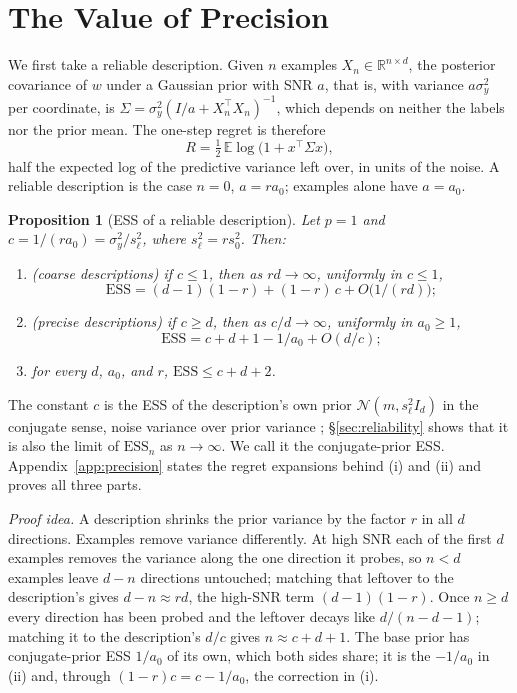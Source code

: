 \documentclass[10pt]{article}
\newtheorem{proposition}{Proposition}
\newcommand{\ess}{\mathrm{ESS}}
\newcommand{\E}{\mathbb{E}}
\newcommand{\R}{\mathbb{R}}
\begin{document}
\section{The Value of Precision}\label{sec:precision}

We first take a reliable description. Given $n$ examples $X_n \in \R^{n \times d}$, the posterior covariance of $w$ under a Gaussian prior with SNR $a$, that is, with variance $a\sigma_y^2$ per coordinate, is $\Sigma = \sigma_y^2 (I/a + X_n^\top X_n)^{-1}$, which depends on neither the labels nor the prior mean. The one-step regret is therefore
\begin{equation}\label{eq:gaussian-regret}
R = \tfrac12\, \E \log\big(1 + x^\top \Sigma x\big),
\end{equation}
half the expected log of the predictive variance left over, in units of the noise. A reliable description is the case $n = 0$, $a = r a_0$; examples alone have $a = a_0$.

\begin{proposition}[ESS of a reliable description]\label{prop:precision}
Let $p = 1$ and $c = 1/(r a_0) = \sigma_y^2/s_\ell^2$, where $s_\ell^2 = r s_0^2$. Then:
\begin{enumerate}
\item[(i)] \emph{(coarse descriptions)} if $c \le 1$, then as $rd \to \infty$, uniformly in $c \le 1$,
\[
\ess = (d-1)(1-r) + (1-r)\,c + O\big(1/(rd)\big);
\]
\item[(ii)] \emph{(precise descriptions)} if $c \ge d$, then as $c/d \to \infty$, uniformly in $a_0 \ge 1$,
\[
\ess = c + d + 1 - 1/a_0 + O(d/c);
\]
\item[(iii)] for every $d$, $a_0$, and $r$, $\ess \le c + d + 2$.
\end{enumerate}
\end{proposition}

The constant $c$ is the ESS of the description's own prior $\mathcal{N}(m, s_\ell^2 I_d)$ in the conjugate sense, noise variance over prior variance \citep{neuenschwander2020}; \S\ref{sec:reliability} shows that it is also the limit of $\ess_n$ as $n \to \infty$. We call it the conjugate-prior ESS. Appendix~\ref{app:precision} states the regret expansions behind (i) and (ii) and proves all three parts.

\emph{Proof idea.} A description shrinks the prior variance by the factor $r$ in all $d$ directions. Examples remove variance differently. At high SNR each of the first $d$ examples removes the variance along the one direction it probes, so $n < d$ examples leave $d - n$ directions untouched; matching that leftover to the description's gives $d - n \approx rd$, the high-SNR term $(d-1)(1-r)$. Once $n \ge d$ every direction has been probed and the leftover decays like $d/(n - d - 1)$; matching it to the description's $d/c$ gives $n \approx c + d + 1$. The base prior has conjugate-prior ESS $1/a_0$ of its own, which both sides share; it is the $-1/a_0$ in (ii) and, through $(1-r)c = c - 1/a_0$, the correction in (i).
\end{document}
